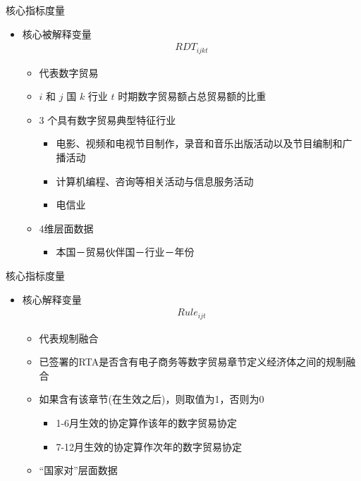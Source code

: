 \documentclass{beamer}
\begin{document}
\begin{frame}{核心指标度量}
    \begin{itemize}
        \item 核心被解释变量
        \begin{align*}
            RDT_{ijkt}
        \end{align*}
        \begin{itemize}
            \item 代表数字贸易
            \item $i$ 和 $j$ 国 $k$ 行业 $t$ 时期数字贸易额占总贸易额的比重
            \item 3 个具有数字贸易典型特征行业
            \begin{itemize}
                \item 电影、视频和电视节目制作，录音和音乐出版活动以及节目编制和广播活动
                \item 计算机编程、咨询等相关活动与信息服务活动
                \item 电信业
            \end{itemize}
            \item 4维层面数据
            \begin{itemize}
                \item 本国－贸易伙伴国－行业－年份
            \end{itemize}
        \end{itemize}
    \end{itemize}
\end{frame}

\begin{frame}{核心指标度量}
    \begin{itemize}
        \item 核心解释变量
        \begin{align*}
            Rule_{ijt}
        \end{align*}
        \begin{itemize}
            \item 代表规制融合
            \item 已签署的RTA是否含有电子商务等数字贸易章节定义经济体之间的规制融合
            \item 如果含有该章节(在生效之后)，则取值为1，否则为0
            \begin{itemize}
                \item 1-6月生效的协定算作该年的数字贸易协定
                \item 7-12月生效的协定算作次年的数字贸易协定
            \end{itemize}
            \item “国家对”层面数据
        \end{itemize}
    \end{itemize}
\end{frame}
\end{document}

